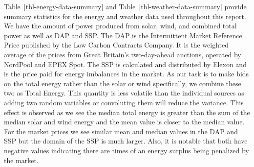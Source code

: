 \documentclass[
  journal,
]{IEEEtran}%
\begin{document}
Table~\ref{tbl-energy-data-summary} and
Table~\ref{tbl-weather-data-summary} provide summary statistics for the
energy and weather data used throughout this report. We have the amount
of power produced from solar, wind, and combined total power as well as
DAP and SSP. The DAP is the Intermittent Market Reference Price
published by the Low Carbon Contracts Company. It is the weighted
average of the prices from Great Britain's two-day-ahead auctions,
operated by NordPool and EPEX Spot. The SSP is calculated and
distributed by Elexon and is the price paid for energy imbalances in the
market. As our task is to make bids on the total energy rather than the
solar or wind specifically, we combine these two as Total Energy. This
quantity is less volatile than the individual sources as adding two
random variables or convoluting them will reduce the variance. This
effect is observed as we see the median total energy is greater than the
sum of the median solar and wind energy and the mean value is closer to
the median value. For the market prices we see similar mean and median
values in the DAP and SSP but the domain of the SSP is much larger.
Also, it is notable that both have negative values indicating there are
times of an energy surplus being penalized by the market.

\begin{table}

\caption{\label{tbl-energy-data-summary}Rebase Energy Data Summary}


\end{table}%
\end{document}
